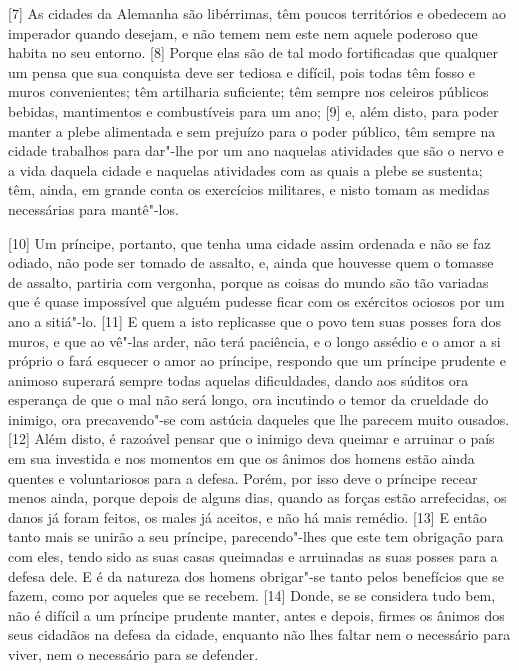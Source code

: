 {[}7{]} As cidades da Alemanha são libérrimas, têm poucos territórios e
obedecem ao imperador quando desejam, e não temem nem este nem aquele
poderoso que habita no seu entorno. {[}8{]} Porque elas são de tal modo
fortificadas que qualquer um pensa que sua conquista deve ser tediosa e
difícil, pois todas têm fosso e muros convenientes; têm artilharia
suficiente; têm sempre nos celeiros públicos bebidas, mantimentos e
combustíveis para um ano; {[}9{]} e, além disto, para poder manter a
plebe alimentada e sem prejuízo para o poder público, têm sempre na
cidade trabalhos para dar"-lhe por um ano naquelas atividades que são o
nervo e a vida daquela cidade e naquelas atividades com as quais a plebe
se sustenta; têm, ainda, em grande conta os exercícios militares, e
nisto tomam as medidas necessárias para mantê"-los.

{[}10{]} Um príncipe, portanto, que tenha uma cidade assim ordenada e
não se faz odiado, não pode ser tomado de assalto, e, ainda que houvesse
quem o tomasse de assalto, partiria com vergonha, porque as coisas do
mundo são tão variadas que é quase impossível que alguém pudesse ficar
com os exércitos ociosos por um ano a sitiá"-lo. {[}11{]} E quem a isto
replicasse que o povo tem suas posses fora dos muros, e que ao vê"-las
arder, não terá paciência, e o longo assédio e o amor a si próprio o
fará esquecer o amor ao príncipe, respondo que um príncipe prudente e
animoso superará sempre todas aquelas dificuldades, dando aos súditos
ora esperança de que o mal não será longo, ora incutindo o temor da
crueldade do inimigo, ora precavendo"-se com astúcia daqueles que lhe
parecem muito ousados. {[}12{]} Além disto, é razoável pensar que o
inimigo deva queimar e arruinar o país em sua investida e nos momentos
em que os ânimos dos homens estão ainda quentes e voluntariosos para a
defesa. Porém, por isso deve o príncipe recear menos ainda, porque
depois de alguns dias, quando as forças estão arrefecidas, os danos já
foram feitos, os males já aceitos, e não há mais remédio. {[}13{]} E
então tanto mais se unirão a seu príncipe, parecendo"-lhes que este tem
obrigação para com eles, tendo sido as suas casas queimadas e arruinadas
as suas posses para a defesa dele. E é da natureza dos homens obrigar"-se
tanto pelos benefícios que se fazem, como por aqueles que se recebem.
{[}14{]} Donde, se se considera tudo bem, não é difícil a um príncipe
prudente manter, antes e depois, firmes os ânimos dos seus cidadãos na
defesa da cidade, enquanto não lhes faltar nem o necessário para viver,
nem o necessário para se defender.

